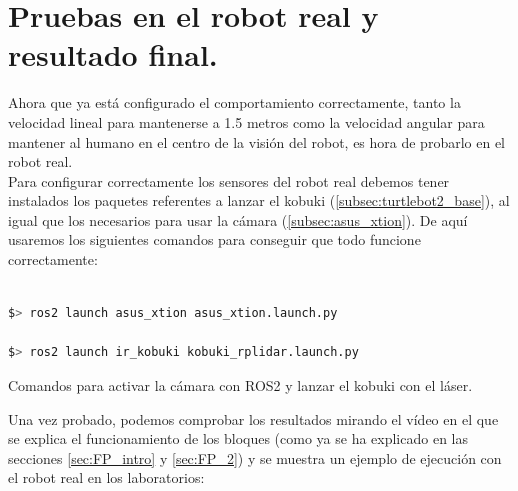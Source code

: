 \section{Pruebas en el robot real y resultado final.}
\label{sec:FP_final}

Ahora que ya está configurado el comportamiento correctamente, tanto la velocidad lineal para mantenerse a 1.5 metros como la velocidad angular para
mantener al humano en el centro de la visión del robot, es hora de probarlo en el robot real.\\

Para configurar correctamente los sensores del robot real debemos tener instalados los paquetes referentes a lanzar el kobuki (\ref{subsec:turtlebot2_base}),
al igual que los necesarios para usar la cámara (\ref{subsec:asus_xtion}).
De aquí usaremos los siguientes comandos para conseguir que todo funcione correctamente:

\begin{code}[H]
    \begin{lstlisting}[language=bash]

$> ros2 launch asus_xtion asus_xtion.launch.py

$> ros2 launch ir_kobuki kobuki_rplidar.launch.py
    \end{lstlisting}
    \caption[Comandos para lanzar kobuki y cámara]{Comandos para activar la cámara con ROS2 y lanzar el kobuki con el láser.}
    \label{cod:coms_kobuki_laser_cam}
\end{code}

Una vez probado, podemos comprobar los resultados mirando el vídeo en el que se explica el funcionamiento de los bloques (como ya se ha explicado en las
secciones \ref{sec:FP_intro} y \ref{sec:FP_2}) y se muestra un ejemplo de ejecución con el robot real en los laboratorios:


